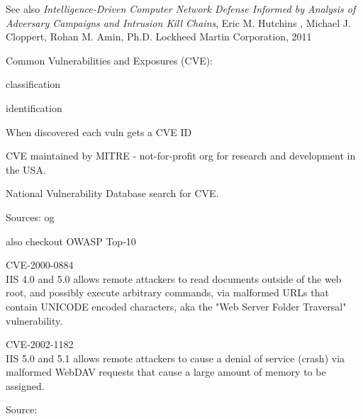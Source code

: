 \documentclass[Screen16to9,17pt]{foils}
\begin{document}


\begin{list2}
\item See also \emph{Intelligence-Driven Computer Network Defense Informed by Analysis of Adversary Campaigns and Intrusion Kill Chains}, Eric M. Hutchins , Michael J. Cloppert, Rohan M. Amin, Ph.D. Lockheed Martin Corporation, 2011\\{\footnotesize
 }
\end{list2}








\begin{list1}
\item Common Vulnerabilities and Exposures (CVE):
  \begin{list2}
  \item classification
  \item identification
  \end{list2}
\item When discovered each vuln gets a CVE ID
\item CVE maintained by MITRE - not-for-profit
org for research and development in the USA.
\item National Vulnerability Database search for CVE.
\item Sources:  og 
\item also checkout OWASP Top-10 
\end{list1}


\begin{list1}
\item \small CVE-2000-0884\\
IIS 4.0 and 5.0 allows remote attackers to read documents outside of
the web root, and possibly execute arbitrary commands, via malformed
URLs that contain UNICODE encoded characters, aka the "Web Server
Folder Traversal" vulnerability.

\item \small CVE-2002-1182\\
IIS 5.0 and 5.1 allows remote attackers to cause a denial of service
(crash) via malformed WebDAV requests that cause a large amount of
memory to be assigned.

\item Source:\\
\end{list1}
\end{document}
